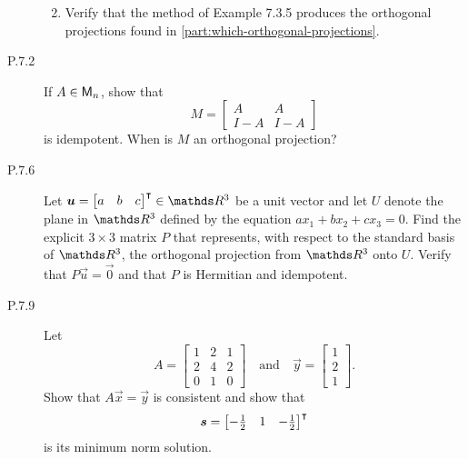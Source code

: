 \documentclass{../homework}
\begin{document}
\begin{description}
\begin{enumerate}
\begin{solution}
    \end{solution}

  \item Verify that the method of Example 7.3.5 produces the
    orthogonal projections found in
    \ref{part:which-orthogonal-projections}.

    \begin{solution}

    \end{solution}
  \end{enumerate}

\item[P.7.2] If \(A \in \mathsf{M}_n\), show that
  \[
    M =
    \begin{bmatrix}
      A   & A \\
      I-A & I-A
    \end{bmatrix}
  \]
  is idempotent.  When is \(M\) an orthogonal projection?

\item[P.7.6] Let
  \(\vec u = \begin{bmatrix} a & b & c \end{bmatrix}^\transpose \in
  \RR^3\) be a unit vector and let \(U\) denote the plane in \(\RR^3\)
  defined by the equation \(a x_1 + b x_2 + c x_3 = 0\).  Find the
  explicit \(3 \times 3\) matrix \(P\) that represents, with respect
  to the standard basis of \(\RR^3\), the orthogonal projection from
  \(\RR^3\) onto \(U\).  Verify that \(P \vec u = \vec 0\) and that
  \(P\) is Hermitian and idempotent.

  \begin{solution}

  \end{solution}

\item[P.7.9] Let
  \[
    A =
    \begin{bmatrix}
      1 & 2 & 1 \\
      2 & 4 & 2 \\
      0 & 1 & 0
    \end{bmatrix}
    \quad \text{and} \quad
    \vec y =
    \begin{bmatrix}
      1 \\ 2 \\ 1
    \end{bmatrix}.
  \]
  Show that \(A \vec x = \vec y\) is consistent and show that
  \[
    \vec s =
    \begin{bmatrix}
      -\frac 1 2 & 1 & -\frac 1 2
    \end{bmatrix}^\transpose
  \]
  is its minimum norm solution.


\end{description}
\end{document}
